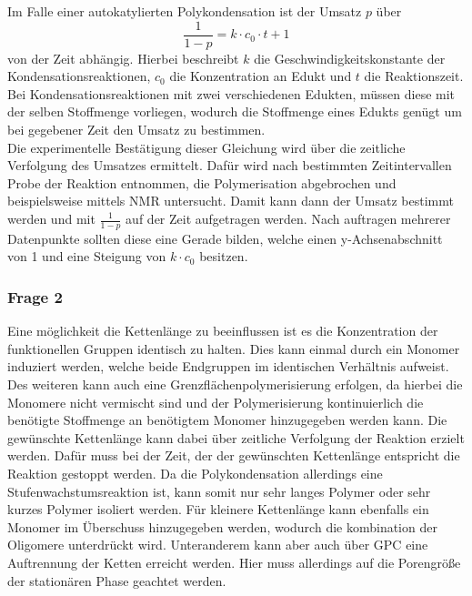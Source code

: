 \documentclass[10pt,a4paper,ngerman]{scrartcl}
\begin{document}
			Im Falle einer autokatylierten Polykondensation ist der Umsatz $p$ über 
			\begin{equation}
				\frac{1}{1-p} = k \cdot c_0 \cdot t + 1 
			\end{equation}
			von der Zeit abhängig. Hierbei beschreibt $k$ die Geschwindigkeitskonstante der Kondensationsreaktionen, $c_0$ die Konzentration an Edukt und $t$ die 
			Reaktionszeit. Bei Kondensationsreaktionen mit zwei verschiedenen Edukten, müssen diese mit der selben Stoffmenge vorliegen, wodurch die Stoffmenge eines
			Edukts genügt um bei gegebener Zeit den Umsatz zu bestimmen. \cite{polyskript}\\
			Die experimentelle Bestätigung dieser Gleichung wird über die zeitliche Verfolgung des Umsatzes ermittelt. Dafür wird nach bestimmten Zeitintervallen Probe 
			der Reaktion entnommen, die Polymerisation abgebrochen und beispielsweise mittels NMR untersucht. Damit kann dann der Umsatz bestimmt werden und mit 
			$\frac{1}{1-p}$ auf der Zeit aufgetragen werden. Nach auftragen mehrerer Datenpunkte sollten diese eine Gerade bilden, welche einen y-Achsenabschnitt von 1
			und eine Steigung von $k \cdot c_0$ besitzen.  

		\subsubsection{Frage 2}

			Eine möglichkeit die Kettenlänge zu beeinflussen ist es die Konzentration der funktionellen Gruppen identisch zu halten. Dies kann einmal durch ein Monomer 
			induziert werden, welche beide Endgruppen im identischen Verhältnis aufweist. Des weiteren kann auch eine Grenzflächenpolymerisierung erfolgen, da hierbei
			die Monomere nicht vermischt sind und der Polymerisierung kontinuierlich die benötigte Stoffmenge an benötigtem Monomer hinzugegeben werden kann. Die 
			gewünschte Kettenlänge kann dabei über zeitliche Verfolgung der Reaktion erzielt werden. Dafür muss bei der Zeit, der der gewünschten Kettenlänge entspricht
			die Reaktion gestoppt werden. Da die Polykondensation allerdings eine Stufenwachstumsreaktion ist, kann somit nur sehr langes Polymer oder sehr kurzes Polymer 
			isoliert werden. Für kleinere Kettenlänge kann ebenfalls ein Monomer im Überschuss hinzugegeben werden, wodurch die kombination der Oligomere unterdrückt wird.
			Unteranderem kann aber auch über GPC eine Auftrennung der Ketten erreicht werden. Hier muss allerdings auf die Porengröße der stationären Phase geachtet werden.
\end{document}
